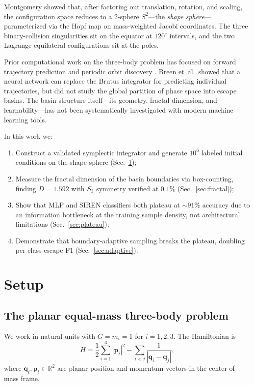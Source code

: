 \documentclass[twocolumn,prl]{revtex4-2}
\begin{document}
Montgomery \cite{Montgomery1998} showed that, after factoring out
translation, rotation, and scaling, the configuration space reduces to a
2-sphere $S^2$---the \emph{shape sphere}---parameterized via the Hopf
map on mass-weighted Jacobi coordinates. The three binary-collision
singularities sit on the equator at $120^\circ$ intervals, and the two
Lagrange equilateral configurations sit at the poles.

Prior computational work on the three-body problem has focused on
forward trajectory prediction \cite{Breen2020} and periodic orbit
discovery \cite{Suvakov2013, Liao2017}. Breen et~al.\ showed that a
neural network can replace the Brutus integrator for predicting
individual trajectories, but did not study the global partition of phase
space into escape basins. The basin structure itself---its geometry,
fractal dimension, and learnability---has not been systematically
investigated with modern machine learning tools.

In this work we:
\begin{enumerate}
\item Construct a validated symplectic integrator and generate $10^6$
  labeled initial conditions on the shape sphere (Sec.~\ref{sec:setup});
\item Measure the fractal dimension of the basin boundaries via
  box-counting, finding $D = 1.592$ with $S_3$ symmetry verified at
  $0.1\%$ (Sec.~\ref{sec:fractal});
\item Show that MLP and SIREN classifiers both plateau at ${\sim}91\%$
  accuracy due to an information bottleneck at the training sample
  density, not architectural limitations (Sec.~\ref{sec:plateau});
\item Demonstrate that boundary-adaptive sampling breaks the plateau,
  doubling per-class escape F1 (Sec.~\ref{sec:adaptive}).
\end{enumerate}


\section{Setup}
\label{sec:setup}

\subsection{The planar equal-mass three-body problem}

We work in natural units with $G = m_i = 1$ for $i = 1, 2, 3$. The
Hamiltonian is
\begin{equation}
H = \frac{1}{2}\sum_{i=1}^3 |\mathbf{p}_i|^2
  - \sum_{i<j} \frac{1}{|\mathbf{q}_i - \mathbf{q}_j|},
\label{eq:hamiltonian}
\end{equation}
where $\mathbf{q}_i, \mathbf{p}_i \in \mathbb{R}^2$ are planar
position and momentum vectors in the center-of-mass frame.
\end{document}
